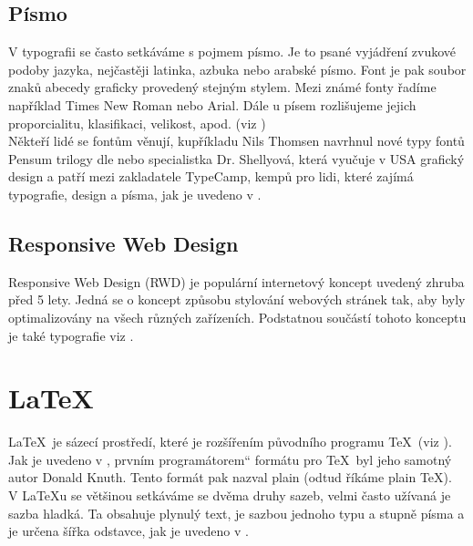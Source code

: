 \documentclass[a4paper, 11pt]{article}
\renewcommand{\uv}[1]{\quotedblbase #1\textquotedblleft}
\begin{document}
\subsection{Písmo}
V typografii se často setkáváme s pojmem písmo. Je to psané vyjádření zvukové podoby jazyka, nejčastěji latinka, azbuka nebo arabské písmo. Font je pak soubor znaků abecedy graficky provedený stejným stylem. Mezi známé fonty řadíme například Times New Roman nebo Arial. Dále u písem rozlišujeme jejich proporcialitu, klasifikaci, velikost, apod. (viz \cite{BcMUNI}) \\

\noindent Někteří lidé se fontům věnují, kupříkladu Nils Thomsen navrhnul nové typy fontů Pensum trilogy dle \cite{TypeMagPensum} nebo specialistka Dr. Shellyová, která vyučuje v USA grafický design a patří mezi zakladatele TypeCamp, kempů pro lidi, které zajímá typografie, design a písma, jak je uvedeno v \cite{PrintMagShelley}.

\subsection{Responsive Web Design}
Responsive Web Design (RWD) je populární internetový koncept uvedený zhruba před 5 lety. Jedná se o koncept způsobu stylování webových stránek tak, aby byly optimalizovány na všech různých zařízeních. Podstatnou součástí tohoto konceptu je také typografie viz \cite{RWDArticle}.

\section{\LaTeX}
\LaTeX\ je sázecí prostředí, které je rozšířením původního programu \TeX\ (viz \cite{LaTeXTutorials}). Jak je uvedeno v \cite{TypografickySystemTeX}, prvním \uv{programátorem} formátu pro \TeX\ byl jeho samotný autor Donald Knuth. Tento formát pak nazval plain (odtud říkáme plain \TeX). \\

\noindent V \LaTeX u se většinou setkáváme se dvěma druhy sazeb, velmi často užívaná je sazba hladká. Ta obsahuje plynulý text, je sazbou jednoho typu a stupně písma a je určena šířka odstavce, jak je uvedeno v \cite{BcMarcela}.


\newpage

\renewcommand{\refname}{Literatura}


\end{document}
